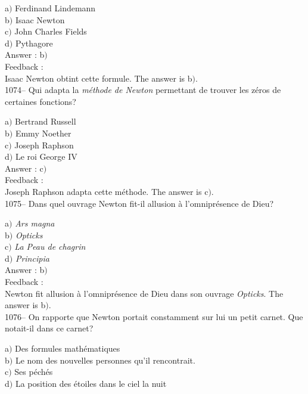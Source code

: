 \documentclass[letterpaper, 12pt]{article}
\begin{document}
a$)$ Ferdinand Lindemann \\
b$)$ Isaac Newton  \\
c$)$ John Charles Fields  \\
d$)$ Pythagore\\

Answer : b$)$\\

Feedback : \\
Isaac Newton obtint cette formule.
The answer is b$)$.\\

1074-- Qui adapta la {\sl m\'ethode de Newton} permettant de trouver
les z\'eros de certaines fonctions?

a$)$ Bertrand Russell \\
b$)$ Emmy Noether  \\
c$)$ Joseph Raphson  \\
d$)$ Le roi George IV\\

Answer : c$)$\\

Feedback : \\
Joseph Raphson adapta cette m\'ethode.
The answer is c$)$.\\

1075-- Dans quel ouvrage Newton fit-il allusion \`a l'omnipr\'esence
de Dieu?

a$)$ {\sl Ars magna} \\
b$)$ {\sl Opticks}  \\
c$)$ {\sl La Peau de chagrin}  \\
d$)$ {\sl Principia}\\

Answer : b$)$\\

Feedback : \\
Newton fit allusion \`a l'omnipr\'esence de Dieu dans son ouvrage
{\sl Opticks}.
The answer is b$)$.\\

1076-- On rapporte que Newton portait constamment sur lui un petit
carnet. Que notait-il dans ce carnet?

a$)$ Des formules math\'ematiques \\
b$)$ Le nom des nouvelles personnes qu'il rencontrait.  \\
c$)$ Ses p\'ech\'es  \\
d$)$ La position des \'etoiles dans le ciel la nuit\\
\end{document}
